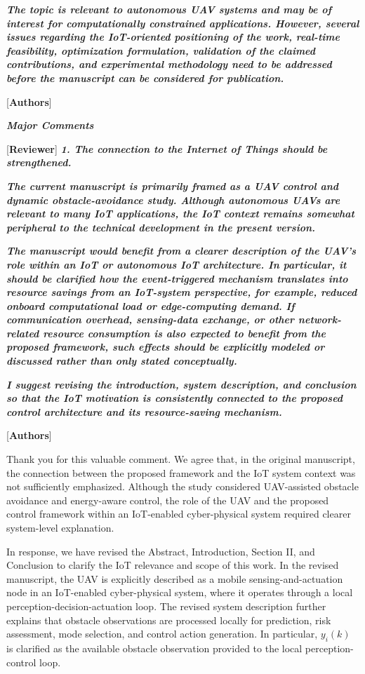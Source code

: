 \documentclass[12pt, twosides]{article}
\theoremstyle{definition}
\begin{document}
\textit{\textbf{The topic is relevant to autonomous UAV systems and may be of interest for computationally constrained applications. However, several issues regarding the IoT-oriented positioning of the work, real-time feasibility, optimization formulation, validation of the claimed contributions, and experimental methodology need to be addressed before the manuscript can be considered for publication.}}

\textcolor[rgb]{0.00,0.00,1.00}{[\textbf{Authors}]}

\textit{\textbf{Major Comments}}

\textcolor[rgb]{0.00,0.00,1.00}{[\textbf {Reviewer}]} \textit{\textbf{1. The connection to the Internet of Things should be strengthened.}}

\textit{\textbf{The current manuscript is primarily framed as a UAV control and dynamic obstacle-avoidance study. Although autonomous UAVs are relevant to many IoT applications, the IoT context remains somewhat peripheral to the technical development in the present version.}}

\textit{\textbf{The manuscript would benefit from a clearer description of the UAV's role within an IoT or autonomous IoT architecture. In particular, it should be clarified how the event-triggered mechanism translates into resource savings from an IoT-system perspective, for example, reduced onboard computational load or edge-computing demand. If communication overhead, sensing-data exchange, or other network-related resource consumption is also expected to benefit from the proposed framework, such effects should be explicitly modeled or discussed rather than only stated conceptually.}}

\textit{\textbf{I suggest revising the introduction, system description, and conclusion so that the IoT motivation is consistently connected to the proposed control architecture and its resource-saving mechanism.}}

\textcolor[rgb]{0.00,0.00,1.00}{[\textbf{Authors}]}

Thank you for this valuable comment. We agree that, in the original manuscript, the connection between the proposed framework and the IoT system context was not sufficiently emphasized. Although the study considered UAV-assisted obstacle avoidance and energy-aware control, the role of the UAV and the proposed control framework within an IoT-enabled cyber-physical system required clearer system-level explanation.

In response, we have revised the Abstract, Introduction, Section II, and Conclusion to clarify the IoT relevance and scope of this work. In the revised manuscript, the UAV is explicitly described as a mobile sensing-and-actuation node in an IoT-enabled cyber-physical system, where it operates through a local perception-decision-actuation loop. The revised system description further explains that obstacle observations are processed locally for prediction, risk assessment, mode selection, and control action generation. In particular, $y_i(k)$ is clarified as the available obstacle observation provided to the local perception-control loop.
\end{document}
